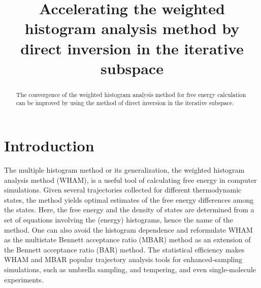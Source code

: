 \documentclass[reprint,aip,jcp,superscriptaddress]{revtex4-1}
\begin{document}
\newcommand{\vct}[1]{\mathbf{#1}}
\newcommand{\vx}{\vct{x}}
\newcommand{\vy}{\vct{y}}
\newcommand{\Z}{\mathcal{Z}}
\newcommand{\E}{\mathcal{E}}
\newcommand{\Ham}{\mathcal{H}}
\newcommand{\W}{\mathcal{W}}




\title{Accelerating the weighted histogram analysis method
by direct inversion in the iterative subspace}

\begin{abstract}
The convergence of the weighted histogram analysis method for free energy calculation
can be improved by using the method of direct inversion in the iterative subspace.
\end{abstract}

\maketitle




\section{Introduction}





The multiple histogram method\cite{
ferrenberg1988, *ferrenberg1989}
or its generalization,
the weighted histogram analysis method (WHAM)\cite{
kumar1992,
bartels1997, *habeck2007, *habeck2012,
souaille2001, kastner2005,
chodera2007, bereau2009,
kim2011},
is a useful tool
of calculating free energy
in computer simulations\cite{
newman, *frenkel}.
%
Given several trajectories collected
for different thermodynamic states,
the method yields optimal estimates
of the free energy differences
among the states.
%
Here, the free energy
and the density of states
are determined
from a set of equations involving
the (energy) histograms,
hence the name of the method.
%
One can also avoid the histogram dependence
and reformulate WHAM
as the multistate Bennett acceptance ratio (MBAR) method\cite{
shirts2008}
as an extension of the Bennett acceptance ratio (BAR) method\cite{
bennett1976}.
%
The statistical efficiency
makes WHAM and MBAR popular trajectory analysis tools
for enhanced-sampling simulations,
such as umbrella sampling\cite{
torrie1974, *laio2002},
and tempering\cite{
marinari1992, *lyubartsev1992,
swendsen1986, *geyer1991, *hukushima1996, *hansmann1997},
and even single-molecule experiments\cite{
shirts2008}.
\end{document}
